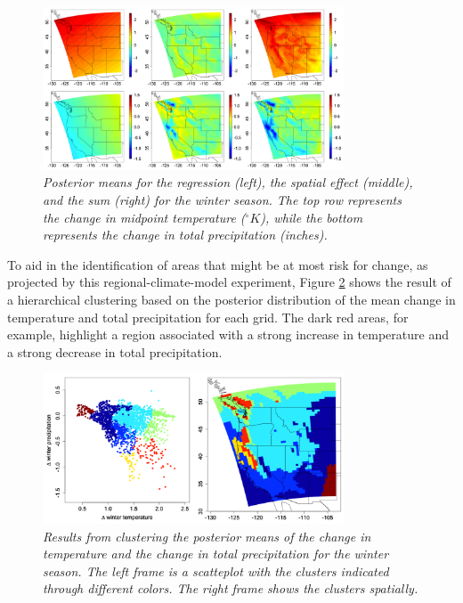 \documentclass[12pt]{amsart}
\begin{document}
\begin{figure}[H]
    \centering
    \includegraphics[width = 0.8\textwidth]{Fig5.png}
    \caption{\emph{Posterior means for the regression (left), the spatial effect (middle), and the sum (right) for the winter season. The top row represents the change in midpoint temperature ($^\circ K$), while the bottom represents the change in total precipitation (inches).}}
    \label{fig: Fig5}
\end{figure}

To aid in the identification of areas that might be at most risk for change, as projected by this regional-climate-model experiment, Figure \ref{fig: Fig6} shows the result of a hierarchical clustering based on the posterior distribution of the mean change in temperature and total precipitation for each grid. The dark red areas, for example, highlight a region associated with a strong increase in temperature and a strong decrease in total precipitation.

\begin{figure}[H]
    \centering
    \includegraphics[width = 0.8\textwidth]{Fig6.png}
    \caption{\emph{Results from clustering the posterior means of the change in temperature and the change in total precipitation for the winter season. The left frame is a scatteplot with the clusters indicated through different colors. The right frame shows the clusters spatially.}}
    \label{fig: Fig6}
\end{figure}
\end{document}
